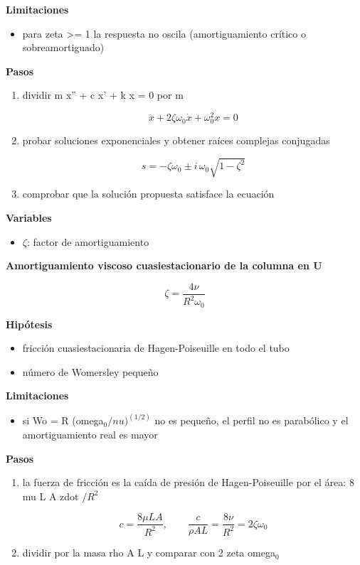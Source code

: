 \documentclass[10pt,openany]{book}
\begin{document}
\begin{tcolorbox}[title={Desarrollos del modelo}, studiumdef, breakable]
\noindent\textbf{Limitaciones}
\begin{itemize}
\item para zeta >= 1 la respuesta no oscila (amortiguamiento crítico o sobreamortiguado)
\end{itemize}

\noindent\textbf{Pasos}
\begin{enumerate}
\item
dividir m x'' + c x' + k x = 0 por m

\[
\ddot x + 2\zeta\omega_0\dot x + \omega_0^{2}x = 0
\]
\item
probar soluciones exponenciales y obtener raíces complejas conjugadas

\[
s = -\zeta\omega_0 \pm i\,\omega_0\sqrt{1 - \zeta^{2}}
\]
\item
comprobar que la solución propuesta satisface la ecuación
\end{enumerate}

\noindent\textbf{Variables}
\begin{itemize}
\item $\zeta$: factor de amortiguamiento
\end{itemize}



\noindent\textbf{Amortiguamiento viscoso cuasiestacionario de la columna en U}

\[
\zeta = \frac{4\nu}{R^{2}\omega_0}
\]

\noindent\textbf{Hipótesis}
\begin{itemize}
\item fricción cuasiestacionaria de Hagen-Poiseuille en todo el tubo
\item número de Womersley pequeño
\end{itemize}

\noindent\textbf{Limitaciones}
\begin{itemize}
\item si Wo = R (omega\(_0/nu)^(1/2)\) no es pequeño, el perfil no es parabólico y el amortiguamiento real es mayor
\end{itemize}

\noindent\textbf{Pasos}
\begin{enumerate}
\item
la fuerza de fricción es la caída de presión de Hagen-Poiseuille por el área: 8 mu L A zdot \(/ R^2\)

\[
c = \frac{8\mu L A}{R^{2}},\qquad \frac{c}{\rho A L} = \frac{8\nu}{R^{2}} = 2\zeta\omega_0
\]
\item
dividir por la masa rho A L y comparar con 2 zeta omega\(_0\)
\end{enumerate}


\end{tcolorbox}
\end{document}
